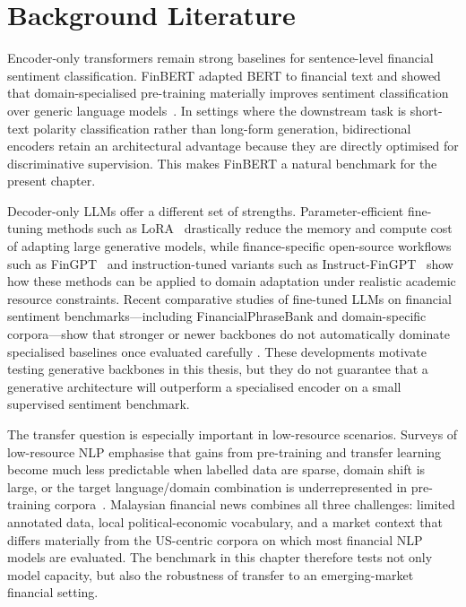 \documentclass[12pt]{ucetd}
\begin{document}
\section{Background Literature}
Encoder-only transformers remain strong baselines for sentence-level financial sentiment classification. FinBERT adapted BERT to financial text and showed that domain-specialised pre-training materially improves sentiment classification over generic language models~\cite{araci2019finbert, yang2020finbert}. In settings where the downstream task is short-text polarity classification rather than long-form generation, bidirectional encoders retain an architectural advantage because they are directly optimised for discriminative supervision. This makes FinBERT a natural benchmark for the present chapter.

Decoder-only LLMs offer a different set of strengths. Parameter-efficient fine-tuning methods such as LoRA~\cite{hu2022lora} drastically reduce the memory and compute cost of adapting large generative models, while finance-specific open-source workflows such as FinGPT~\cite{yang2023fingpt} and instruction-tuned variants such as Instruct-FinGPT~\cite{zhang2023instructfingpt} show how these methods can be applied to domain adaptation under realistic academic resource constraints. Recent comparative studies of fine-tuned LLMs on financial sentiment benchmarks---including FinancialPhraseBank and domain-specific corpora---show that stronger or newer backbones do not automatically dominate specialised baselines once evaluated carefully \cite{shobayo2024innovative, nasiopoulos2025financial, mo2024finetuning}. These developments motivate testing generative backbones in this thesis, but they do not guarantee that a generative architecture will outperform a specialised encoder on a small supervised sentiment benchmark.

The transfer question is especially important in low-resource scenarios. Surveys of low-resource NLP emphasise that gains from pre-training and transfer learning become much less predictable when labelled data are sparse, domain shift is large, or the target language/domain combination is underrepresented in pre-training corpora~\cite{hedderich2021survey}. Malaysian financial news combines all three challenges: limited annotated data, local political-economic vocabulary, and a market context that differs materially from the US-centric corpora on which most financial NLP models are evaluated. The benchmark in this chapter therefore tests not only model capacity, but also the robustness of transfer to an emerging-market financial setting.
\end{document}
